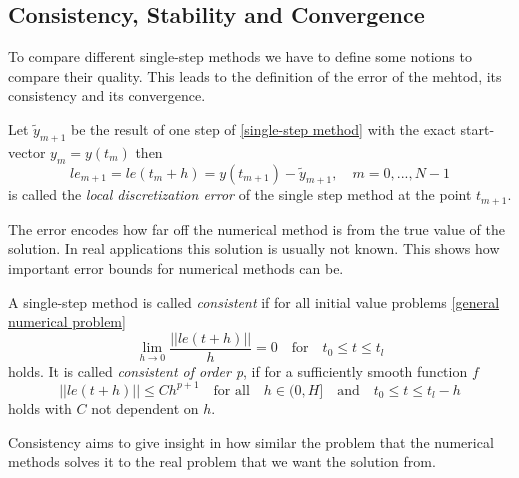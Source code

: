 	\subsection{Consistency, Stability and Convergence}
	
	To compare different single-step methods we have to define some notions to compare their quality. This leads to the definition of the error of the mehtod, its consistency and its convergence.
	
	\begin{definition}\label{Discretization_Error_SingleStep}
		Let $\tilde{y}_{m+1}$ be the result of one step of \ref{single-step method} with the exact start-vector $y_m = y(t_m)$ then
		\begin{equation}
			\label{local discretization error single step}
			le_{m+1} = le(t_m+h) = y(t_{m+1}) - \tilde{y}_{m+1}, \quad m = 0,...,N-1
		\end{equation}
		is called the \emph{local discretization error} of the single step method at the point $t_{m+1}$.
	\end{definition}

	The error encodes how far off the numerical method is from the true value of the solution. In real applications this solution is usually not known. This shows how important error bounds for numerical methods can be.

	\begin{definition}\label{Consistency_SingleStep}
		A single-step method is called \emph{consistent} if for all initial value problems \ref{general numerical problem} 
		\begin{equation}
			\lim\limits_{h \to 0} \frac{||le(t+h)||}{h} = 0 \quad \text{for} \quad t_0 \leq t \leq t_l
		\end{equation}
		holds.\newline
		It is called \emph{consistent of order p}, if for a sufficiently smooth function $f$
		\begin{equation}
			||le(t+h)|| \leq Ch^{p+1} \quad \text{for all} \quad h \in \mathopen{(} 0,H \mathclose{]} \quad \text{and} \quad t_0 \leq t \leq t_l - h
		\end{equation}
		holds with $C$ not dependent on $h$.
	\end{definition}

	Consistency aims to give insight in how similar the problem that the numerical methods solves it to the real problem that we want the solution from. 

